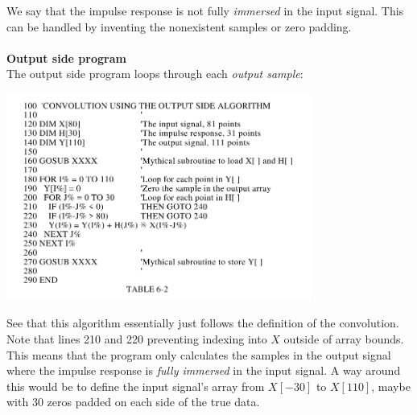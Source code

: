 \documentclass{report}
\begin{document}
We say that the impulse response is not fully \textit{immersed} in the input signal. 
This can be handled by inventing the nonexistent samples or zero padding.\\
\vspace{1mm}\\
\textbf{Output side program}\\
The output side program loops through each \textit{output sample}:
\begin{center}
\includegraphics[width=10cm]{a8}\\
\end{center}
See that this algorithm essentially just follows the definition of the convolution. Note that lines 210 and 220
preventing indexing into $X$ outside of array bounds. This means that the program only
calculates the samples in the output signal where the impulse response is \textit{fully immersed} in
the input signal. A way around this would be to define the input signal's array from 
$X[-30]$ to $X[110]$, maybe with 30 zeros padded on each side of the true data.
\newpage
\end{document}
